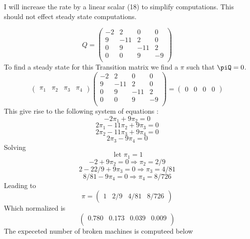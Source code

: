 \documentclass{article}
\begin{document}
I will increase the rate by a linear scalar (18) to simplify computations. This
should not effect steady state computations. 

\[ Q = \left(\begin{array}{cccc}
 -2 & 2 & 0 & 0 \\
 9 & -11 & 2 & 0 \\
 0 & 9 & -11 & 2 \\
 0 & 0 & 9 & -9 \\
\end{array}\right)\]
To find a steady state for this Transition matrix we find a $\pi$ such that
$\piQ = 0$.
\[
\left(\begin{array}{cccc}
\pi_1 &\pi_2 & \pi_3 & \pi_4 
\end{array}\right)
\left(\begin{array}{cccc}
 -2 & 2 & 0 & 0 \\
 9 & -11 & 2 & 0 \\
 0 & 9 & -11 & 2 \\
 0 & 0 & 9 & -9 \\
\end{array}\right) = \left(\begin{array}{cccc}
0 & 0 & 0 & 0
\end{array}\right)\]	
This give rise to the following system of equations  :
\[ -2\pi_1 + 9\pi_2 = 0 \]
\[ 2\pi_1 - 11\pi_2 + 9\pi_3 = 0 \]
\[ 2\pi_2 - 11\pi_3 + 9\pi_4 = 0 \]
\[ 2\pi_3 - 9\pi_4 = 0 \]
Solving 
\[\mbox{ let } \boxed{\pi_1 = 1}\]
\[-2 + 9\pi_2 = 0 \Rightarrow \boxed{\pi_2 = 2/9} \]
\[2 - 22/9 + 9\pi_3 = 0 \Rightarrow \boxed{\pi_3 = 4/81} \]
\[ 8/81 - 9\pi_4 = 0 \Rightarrow \boxed{\pi_4 = 8/726} \]
Leading to
\[ \pi = \left(\begin{array}{cccc}
1 & 2/9 & 4/81 & 8/726
\end{array}\right)\]
Which normalized is 
\[\left(\begin{array}{cccc}
 0.780 & 0.173 & 0.039 & 0.009 \\
\end{array}\right)\]
The expeceted number of broken machines is computeed below
\end{document}

